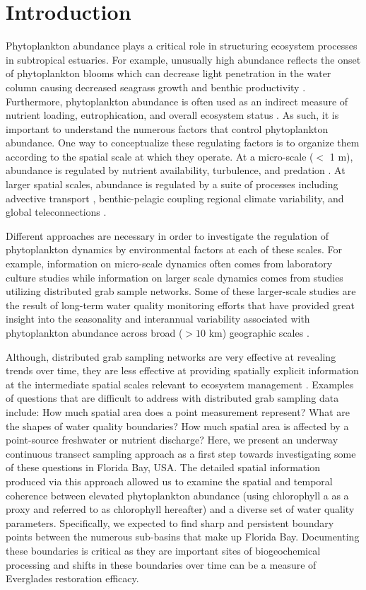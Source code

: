 \section{Introduction}
\label{intro}
Phytoplankton abundance plays a critical role in structuring ecosystem processes in subtropical estuaries. For example, unusually high abundance reflects the onset of phytoplankton blooms which can decrease light penetration in the water column causing decreased seagrass growth and benthic productivity \citep{kelble_2005}. Furthermore, phytoplankton abundance is often used as an indirect measure of nutrient loading, eutrophication, and overall ecosystem status \citep{boyer_2009}. As such, it is important to understand the numerous factors that control phytoplankton abundance. One way to conceptualize these regulating factors is to organize them according to the spatial scale at which they operate. At a micro-scale ($<$ 1 m), abundance is regulated by nutrient availability, turbulence, and predation \cite{mann2013dynamics}. At larger spatial scales, abundance is regulated by a suite of processes including advective transport \cite{dugdale2012river}, benthic-pelagic coupling \cite{zhang_2014, lawrence2004wind} regional climate variability, and global teleconnections \cite{briceno_climatic_2009}.

Different approaches are necessary in order to investigate the regulation of phytoplankton dynamics by environmental factors at each of these scales. For example, information on micro-scale dynamics often comes from laboratory culture studies while information on larger scale dynamics comes from studies utilizing distributed grab sample networks. Some of these larger-scale studies are the result of long-term water quality monitoring efforts that have provided great insight into the seasonality and interannual variability associated with phytoplankton abundance across broad ($>10$ km) geographic scales \cite{cloern_patterns_2010}.

Although, distributed grab sampling networks are very effective at revealing trends over time, they are less effective at providing spatially explicit information at the intermediate spatial scales relevant to ecosystem management \cite{anttila2008feasible}. Examples of questions that are difficult to address with distributed grab sampling data include: How much spatial area does a point measurement represent? What are the shapes of water quality boundaries? How much spatial area is affected by a point-source freshwater or nutrient discharge? Here, we present an underway continuous transect sampling approach as a first step towards investigating some of these questions in Florida Bay, USA. The detailed spatial information produced via this approach allowed us to examine the spatial and temporal coherence between elevated phytoplankton abundance (using chlorophyll a as a proxy and referred to as chlorophyll hereafter) and a diverse set of water quality parameters. Specifically, we expected to find sharp and persistent boundary points between the numerous sub-basins that make up Florida Bay. Documenting these boundaries is critical as they are important sites of biogeochemical processing and shifts in these boundaries over time can be a measure of Everglades restoration efficacy.

